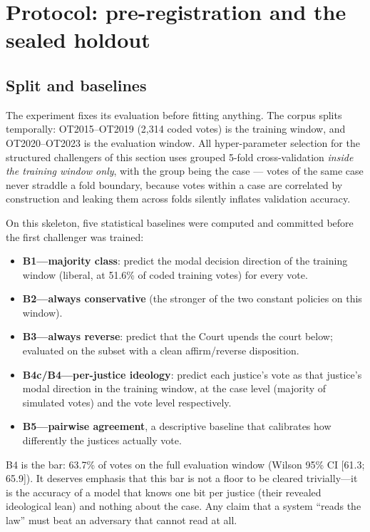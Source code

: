\section{Protocol: pre-registration and the sealed holdout}
\label{sec:protocol}

\subsection{Split and baselines}

The experiment fixes its evaluation before fitting anything. The
corpus splits temporally: OT2015--OT2019 (2{,}314 coded votes) is the
training window, and OT2020--OT2023 is the evaluation window. All
hyper-parameter selection for the structured challengers of this
section uses grouped 5-fold cross-validation
\emph{inside the training window only}, with the group being the case
--- votes of the same case never straddle a fold boundary, because
votes within a case are correlated by construction and leaking them
across folds silently inflates validation accuracy.

On this skeleton, five statistical baselines were computed and
committed before the first challenger was trained:

\begin{itemize}[leftmargin=1.6em,itemsep=2pt]
  \item \textbf{B1---majority class}: predict the modal decision
  direction of the training window (liberal, at 51.6\% of coded
  training votes) for every vote.
  \item \textbf{B2---always conservative} (the stronger of the two
  constant policies on this window).
  \item \textbf{B3---always reverse}: predict that the Court
  upends the court below; evaluated on the subset with a clean
  affirm/reverse disposition.
  \item \textbf{B4c/B4---per-justice ideology}: predict each
  justice's vote as that justice's modal direction in the training
  window, at the case level (majority of simulated votes) and the
  vote level respectively.
  \item \textbf{B5---pairwise agreement}, a descriptive baseline
  that calibrates how differently the justices actually vote.
\end{itemize}

B4 is the bar: 63.7\% of votes on the full evaluation window (Wilson
95\% CI [61.3; 65.9]). It deserves emphasis that this bar is not a
floor to be cleared trivially---it is the accuracy of a model that
knows one bit per justice (their revealed ideological lean) and
nothing about the case. Any claim that a system ``reads the law''
must beat an adversary that cannot read at all.

